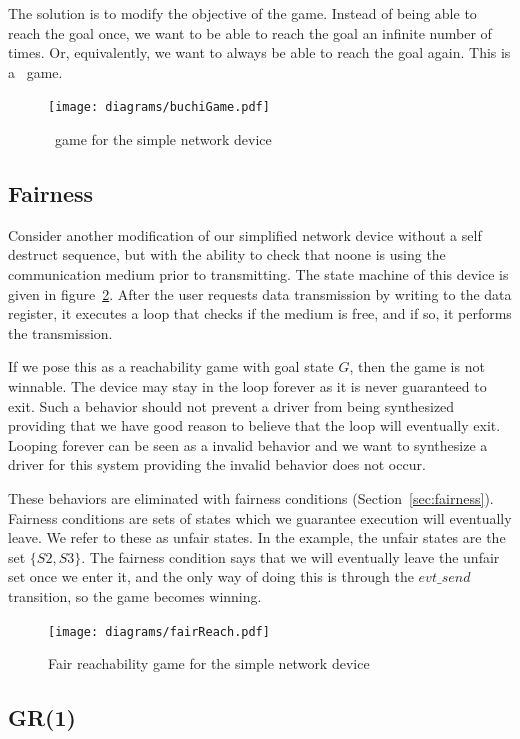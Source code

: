 The solution is to modify the objective of the game. Instead of being able to reach the goal once, we want to be able to reach the goal an infinite number of times. Or, equivalently, we want to always be able to reach the goal again. This is a \buchi\ game.

\begin{figure}
\centering
\texttt{[image: diagrams/buchiGame.pdf]}
\caption{\buchi\ game for the simple network device}
\label{fig:buchi}
\end{figure}

\subsection{Fairness}

Consider another modification of our simplified network device without a self destruct sequence, but with the ability to check that noone is using the communication medium prior to transmitting. The state machine of this device is given in figure~\ref{fig:fair}. After the user requests data transmission by writing to the data register, it executes a loop that checks if the medium is free, and if so, it performs the transmission. 

If we pose this as a reachability game with goal state $G$, then the game is not winnable. The device may stay in the loop forever as it is never guaranteed to exit. Such a behavior should not prevent a driver from being synthesized providing that we have good reason to believe that the loop will eventually exit. Looping forever can be seen as a invalid behavior and we want to synthesize a driver for this system providing the invalid behavior does not occur. 

These behaviors are eliminated with fairness conditions (Section~\ref{sec:fairness}). Fairness conditions are sets of states which we guarantee execution will eventually leave. We refer to these as unfair states. In the example, the unfair states are the set $\{S2, S3\}$. The fairness condition says that we will eventually leave the unfair set once we enter it, and the only way of doing this is through the $evt\_send$ transition, so the game becomes winning.

\begin{figure}[t]
\centering
\texttt{[image: diagrams/fairReach.pdf]}
\caption{Fair reachability game for the simple network device}
\label{fig:fair}
\end{figure}

\subsection{GR(1)}

